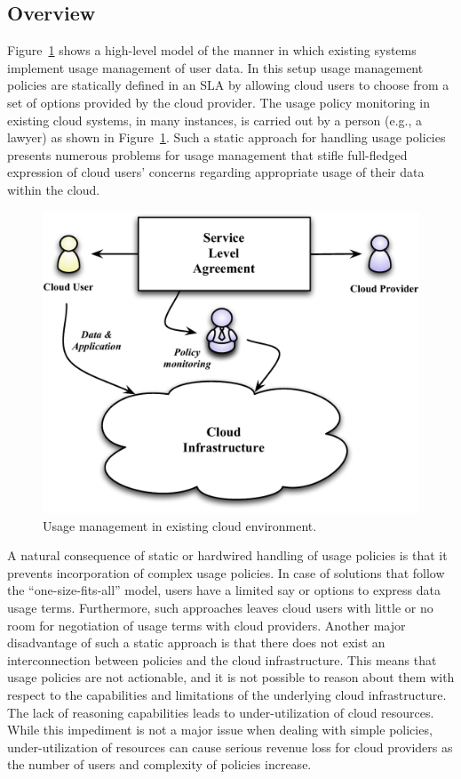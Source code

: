 \documentclass[notitlepage]{book}
\begin{document}
\begin{doublespace}
\subsection{Overview}
Figure~\ref{fig:overview} shows a high-level model of the manner in which existing systems implement usage management of user data. In this setup usage management policies are statically defined in an SLA by allowing cloud users to choose from a set of options provided by the cloud provider. The usage policy monitoring in existing cloud systems, in many instances, is carried out by a person (e.g., a lawyer) as shown in Figure~\ref{fig:overview}.  Such a static approach for handling usage policies presents numerous problems for usage management that stifle full-fledged expression of cloud users' concerns regarding appropriate usage of their data within the cloud.   


\begin{figure}[!t]
\centering
\includegraphics[scale=0.5]{Overview.pdf}
\caption{Usage management in existing cloud environment.}
\label{fig:overview}
\end{figure}

A natural consequence of static or hardwired handling of usage policies is that it prevents incorporation of complex usage policies. In case of solutions that follow the ``one-size-fits-all'' model, users have a limited say or options to express data usage terms. Furthermore, such approaches leaves cloud users with little or no room for negotiation of usage terms with cloud providers. Another major disadvantage of such a static approach is that there does not exist an interconnection between policies and the cloud infrastructure. This means that usage policies are not actionable, and it is not possible to reason about them with respect to the capabilities and limitations of the underlying cloud infrastructure. The lack of reasoning capabilities leads to under-utilization of cloud resources. While this impediment is not a major issue when dealing with simple policies, under-utilization of resources can cause serious revenue loss for cloud providers as the number of users and complexity of policies increase. 


\end{doublespace}
\end{document}
